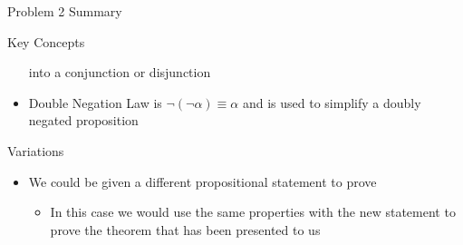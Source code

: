 \begin{summary}{Problem 2 Summary}
\begin{statement}{Key Concepts}
\begin{itemize}
            into a conjunction or disjunction
            \item Double Negation Law is $\neg (\neg \alpha) \equiv \alpha$ and is used to simplify a doubly negated proposition
        \end{itemize}
    \end{statement}
    \begin{statement}{Variations}
        \begin{itemize}
            \item We could be given a different propositional statement to prove
            \begin{itemize}
                \item In this case we would use the same properties with the new statement to prove the theorem that has been presented to us
            \end{itemize}
        \end{itemize}
    \end{statement}
\end{summary}

